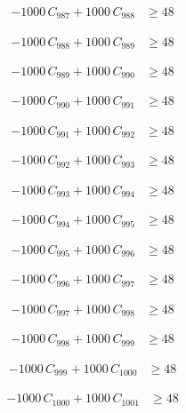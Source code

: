 \documentclass[a4paper,11pt]{article}
\begin{document}
\begin{align}
-1000\,C_{987} + 1000\,C_{988} &\geq 48 \nonumber
\end{align}

\begin{align}
-1000\,C_{988} + 1000\,C_{989} &\geq 48 \nonumber
\end{align}

\begin{align}
-1000\,C_{989} + 1000\,C_{990} &\geq 48 \nonumber
\end{align}

\begin{align}
-1000\,C_{990} + 1000\,C_{991} &\geq 48 \nonumber
\end{align}

\begin{align}
-1000\,C_{991} + 1000\,C_{992} &\geq 48 \nonumber
\end{align}

\begin{align}
-1000\,C_{992} + 1000\,C_{993} &\geq 48 \nonumber
\end{align}

\begin{align}
-1000\,C_{993} + 1000\,C_{994} &\geq 48 \nonumber
\end{align}

\begin{align}
-1000\,C_{994} + 1000\,C_{995} &\geq 48 \nonumber
\end{align}

\begin{align}
-1000\,C_{995} + 1000\,C_{996} &\geq 48 \nonumber
\end{align}

\begin{align}
-1000\,C_{996} + 1000\,C_{997} &\geq 48 \nonumber
\end{align}

\begin{align}
-1000\,C_{997} + 1000\,C_{998} &\geq 48 \nonumber
\end{align}

\begin{align}
-1000\,C_{998} + 1000\,C_{999} &\geq 48 \nonumber
\end{align}

\begin{align}
-1000\,C_{999} + 1000\,C_{1000} &\geq 48 \nonumber
\end{align}

\begin{align}
-1000\,C_{1000} + 1000\,C_{1001} &\geq 48 \nonumber
\end{align}
\end{document}
